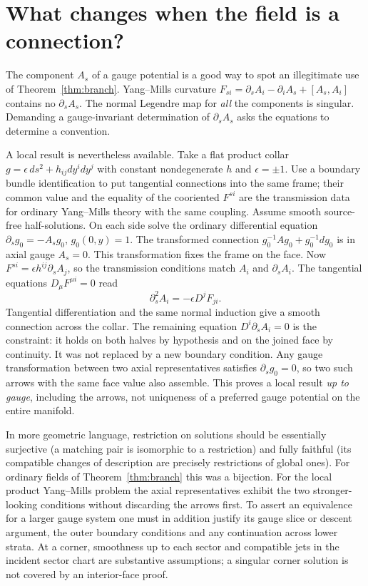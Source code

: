 \section{What changes when the field is a connection?}
The component $A_s$ of a gauge potential is a good way to spot an illegitimate use of Theorem~\ref{thm:branch}. Yang--Mills curvature $F_{si}=\partial_s A_i-\partial_i A_s+[A_s,A_i]$ contains no $\partial_s A_s$. The normal Legendre map for \emph{all} the components is singular. Demanding a gauge-invariant determination of $\partial_s A_s$ asks the equations to determine a convention.

A local result is nevertheless available. Take a flat product collar $g=\epsilon\,ds^2+h_{ij}dy^i dy^j$ with constant nondegenerate $h$ and $\epsilon=\pm1$. Use a boundary bundle identification to put tangential connections into the same frame; their common value and the equality of the cooriented $F^{si}$ are the transmission data for ordinary Yang--Mills theory with the same coupling. Assume smooth source-free half-solutions. On each side solve the ordinary differential equation $\partial_s g_0=-A_s g_0$, $g_0(0,y)=1$. The transformed connection $g_0^{-1}Ag_0+g_0^{-1}dg_0$ is in axial gauge $A_s=0$. This transformation fixes the frame on the face. Now $F^{si}=\epsilon h^{ij}\partial_s A_j$, so the transmission conditions match $A_i$ and $\partial_s A_i$. The tangential equations $D_\mu F^{\mu i}=0$ read
\[
 \partial_s^2 A_i=-\epsilon D^j F_{ji} .
\]
Tangential differentiation and the same normal induction give a smooth connection across the collar. The remaining equation $D^i\partial_s A_i=0$ is the constraint: it holds on both halves by hypothesis and on the joined face by continuity. It was not replaced by a new boundary condition. Any gauge transformation between two axial representatives satisfies $\partial_s g_0=0$, so two such arrows with the same face value also assemble. This proves a local result \emph{up to gauge}, including the arrows, not uniqueness of a preferred gauge potential on the entire manifold.

In more geometric language, restriction on solutions should be essentially surjective (a matching pair is isomorphic to a restriction) and fully faithful (its compatible changes of description are precisely restrictions of global ones). For ordinary fields of Theorem~\ref{thm:branch} this was a bijection. For the local product Yang--Mills problem the axial representatives exhibit the two stronger-looking conditions without discarding the arrows first. To assert an equivalence for a larger gauge system one must in addition justify its gauge slice or descent argument, the outer boundary conditions and any continuation across lower strata. At a corner, smoothness up to each sector and compatible jets in the incident sector chart are substantive assumptions; a singular corner solution is not covered by an interior-face proof.

